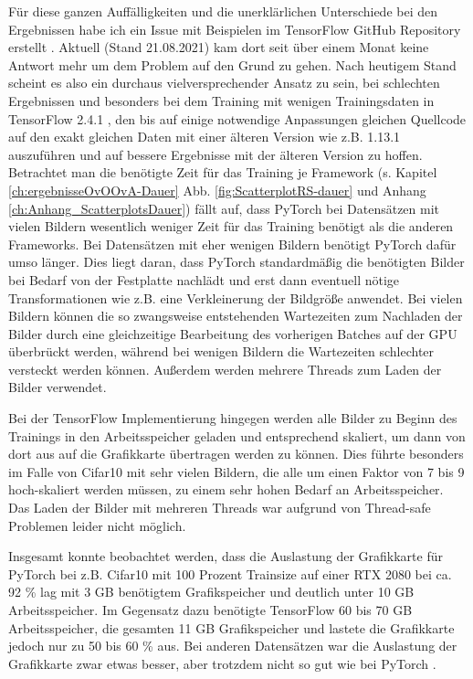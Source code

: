Für diese ganzen Auffälligkeiten und die unerklärlichen Unterschiede bei den Ergebnissen habe ich ein Issue mit Beispielen im TensorFlow GitHub Repository erstellt \cite{githubTFIssue}. Aktuell (Stand 21.08.2021) kam dort seit über einem Monat keine Antwort mehr um dem Problem auf den Grund zu gehen.
Nach heutigem Stand scheint es also ein durchaus vielversprechender Ansatz zu sein, bei schlechten Ergebnissen und besonders bei dem Training mit wenigen Trainingsdaten in TensorFlow 2.4.1 \cite{tensorflow}, den bis auf einige notwendige Anpassungen gleichen Quellcode auf den exakt gleichen Daten mit einer älteren Version wie z.B. 1.13.1 auszuführen und auf bessere Ergebnisse mit der älteren Version zu hoffen.
\newpage
Betrachtet man die benötigte Zeit für das Training je Framework (s. Kapitel \ref{ch:ergebnisseOvOOvA-Dauer} Abb. \ref{fig:ScatterplotRS-dauer} und Anhang \ref{ch:Anhang_ScatterplotsDauer}) fällt auf, dass PyTorch \cite{pytorch} bei Datensätzen mit vielen Bildern wesentlich weniger Zeit für das Training benötigt als die anderen Frameworks. Bei Datensätzen mit eher wenigen Bildern benötigt PyTorch \cite{pytorch} dafür umso länger. Dies liegt daran, dass PyTorch \cite{pytorch} standardmäßig die benötigten Bilder bei Bedarf von der Festplatte nachlädt und erst dann eventuell nötige Transformationen wie z.B. eine Verkleinerung der Bildgröße anwendet. Bei vielen Bildern können die so zwangsweise entstehenden Wartezeiten zum Nachladen der Bilder durch eine gleichzeitige Bearbeitung des vorherigen Batches auf der GPU überbrückt werden, während bei wenigen Bildern die Wartezeiten schlechter versteckt werden können. Außerdem werden mehrere Threads zum Laden der Bilder verwendet.


Bei der TensorFlow \cite{tensorflow} Implementierung hingegen werden alle Bilder zu Beginn des Trainings in den Arbeitsspeicher geladen und entsprechend skaliert, um dann von dort aus auf die Grafikkarte übertragen werden zu können. Dies führte besonders im Falle von Cifar10 \cite{cifar10} mit sehr vielen Bildern, die alle um einen Faktor von 7 bis 9 hoch-skaliert werden müssen, zu einem sehr hohen Bedarf an Arbeitsspeicher. Das Laden der Bilder mit mehreren Threads war aufgrund von Thread-safe Problemen leider nicht möglich.


Insgesamt konnte beobachtet werden, dass die Auslastung der Grafikkarte für PyTorch \cite{pytorch} bei z.B. Cifar10 mit 100 Prozent Trainsize auf einer RTX 2080 bei ca. 92 \% lag mit 3 GB benötigtem Grafikspeicher und deutlich unter 10 GB Arbeitsspeicher. Im Gegensatz dazu benötigte TensorFlow \cite{tensorflow} 60 bis 70 GB Arbeitsspeicher, die gesamten 11 GB Grafikspeicher und lastete die Grafikkarte jedoch nur zu 50 bis 60 \% aus.
Bei anderen Datensätzen war die Auslastung der Grafikkarte zwar etwas besser, aber trotzdem nicht so gut wie bei PyTorch \cite{pytorch}.


